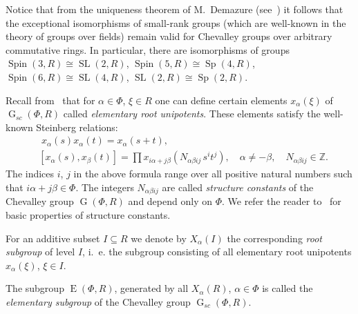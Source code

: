 \documentclass[12pt]{amsart}
\theoremstyle{plain}
\numberwithin{equation}{section}
\numberwithin{lemma}{section}
\theoremstyle{definition}
\theoremstyle{remark}
\DeclareMathOperator{\G}{G}
\DeclareMathOperator{\SL}{SL}
\DeclareMathOperator{\Sp}{Sp}
\DeclareMathOperator{\E}{E}
\DeclareMathOperator{\Spin}{Spin}
\begin{document}
Notice that from the uniqueness theorem of M.~Demazure (see~\cite[Corollaire~5.2]{SGA3}) 
it follows that the exceptional isomorphisms of small-rank groups (which are well-known in the theory of groups over fields) remain valid for Chevalley groups over arbitrary commutative rings.
In particular, there are isomorphisms of groups $\Spin(3, R)\cong\SL(2, R)$, $\Spin(5, R)\cong \Sp(4, R)$, $\Spin(6, R)\cong\SL(4, R)$, $\SL(2, R)\cong \Sp(2, R)$.  

Recall from~\cite{St78, VP} that for $\alpha\in \Phi$, $\xi\in R$ one can define certain elements $x_{\alpha}(\xi)$ of $\G_{sc}(\Phi, R)$ called {\it elementary root unipotents}.
These elements satisfy the well-known Steinberg relations:
\begin{align}
& \phantom{[}
x_\alpha(s) x_\alpha(t) = x_\alpha(s+t), \label{rel:add}\\
& [x_\alpha(s), x_\beta(t)] = \prod x_{i\alpha + j\beta}\left(N_{\alpha\beta ij}\, s^i t^j\right), \quad \alpha\neq-\beta, \quad N_{\alpha\beta ij}\in\mathbb{Z}. \label{rel:CCF}
\end{align} 
The indices $i$, $j$ in the above formula range over all positive natural numbers such that $i\alpha + j\beta\in\Phi$.
The integers $N_{\alpha\beta ij}$ are called {\it structure constants} of the Chevalley group $\G(\Phi, R)$ and depend only on $\Phi$.
We refer the reader to~\cite[\S14]{VP} for basic properties of structure constants.

For an additive subset $I\subseteq R$ we denote by $X_\alpha(I)$ the corresponding \emph{root subgroup} of level $I$, i.\, e. the subgroup consisting of all elementary root unipotents $x_\alpha(\xi)$, $\xi\in I$.

The subgroup $\E(\Phi, R)$, generated by all $X_\alpha(R)$, $\alpha\in\Phi$ is called the {\it elementary subgroup} of the Chevalley group $\G_{sc}(\Phi, R)$.
\end{document}
